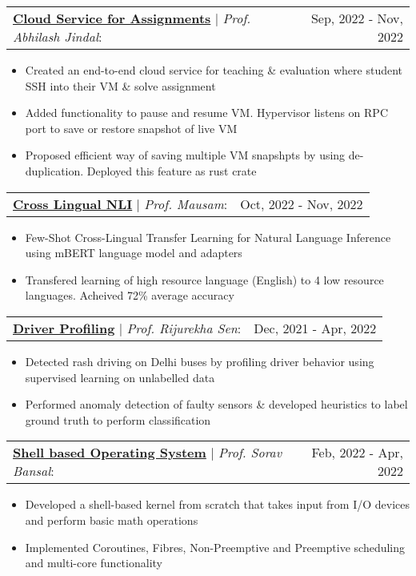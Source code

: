 \documentclass[letterpaper,11pt]{article}
\makeatletter
\newcommand{\resumeItem}[1]{
  \item\small{
    {#1 \vspace{-2pt}}
  }
}
\newcommand{\headingStart}{
  \begin{tabular*}{0.97\textwidth}[t]{l@{\extracolsep{\fill}}r}
}
\newcommand{\projectHeading}[3]{
    \item
    \headingStart
      \underline{\textbf{#1}} $|$ \textit{#2}: & #3 \\
    \end{tabular*}\vspace{-7pt}
}
\newcommand{\itemListStart}[1]
  {\begin{itemize}[leftmargin=#1in, rightmargin=0in]}
\newcommand{\itemListEnd}{\end{itemize}\vspace{-5pt}}
\makeatother
\begin{document}
      \projectHeading
        {Cloud Service for Assignments}
        {Prof. Abhilash Jindal}
        {Sep, 2022 - Nov, 2022}
        \itemListStart{0.2}
          \resumeItem{Created an end-to-end cloud service for teaching \& evaluation where student SSH into their VM \& solve assignment}
          \resumeItem{Added functionality to pause and resume VM. Hypervisor listens on RPC port to save or restore snapshot of live VM }
          \resumeItem{Proposed efficient way of saving multiple VM snapshpts by using de-duplication. Deployed this feature as rust crate}
        \itemListEnd
      
      \projectHeading
        {Cross Lingual NLI}
        {Prof. Mausam}
        {Oct, 2022 - Nov, 2022}
        \itemListStart{0.2}
          \resumeItem{Few-Shot Cross-Lingual Transfer Learning for Natural Language Inference using mBERT language model and adapters}
          \resumeItem{Transfered learning of high resource language (English) to 4 low resource languages. Acheived 72\% average accuracy}
        \itemListEnd


      \projectHeading
        {Driver Profiling}
        {Prof. Rijurekha Sen}
        {Dec, 2021 - Apr, 2022}
        \itemListStart{0.2}
          \resumeItem{Detected rash driving on Delhi buses by profiling driver behavior using supervised learning on unlabelled data}
          \resumeItem{Performed anomaly detection of faulty sensors \& developed heuristics to label ground truth to perform classification}
        \itemListEnd


      \projectHeading
        {Shell based Operating System}
        {Prof. Sorav Bansal}
        {Feb, 2022 - Apr, 2022}
        \itemListStart{0.2}
          \resumeItem{Developed a shell-based kernel from scratch that takes input from I/O devices and perform basic math operations}
          \resumeItem{Implemented Coroutines, Fibres, Non-Preemptive and Preemptive scheduling and multi-core functionality}
        \itemListEnd

\end{document}
